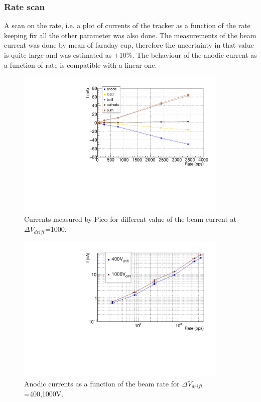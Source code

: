 \documentclass[a4paper, 11 pt]{report}
\newcommand{\Vdrift}{$ \Delta V_{drift}$}
\begin{document}
  \subsubsection{Rate scan}

  A scan on the rate, i.e. a plot of currents of the tracker as a function of the 
  rate keeping fix all the other parameter was also done.
  The measurements of the beam current was done by mean of faraday cup, therefore
  the uncertainty in that value is quite large and was estimated as $\pm$10\%.
  The behaviour of the anodic current as a function of rate is compatible with
  a linear one.
  \begin{figure}[htbp]
	\centering
	\includegraphics[width=0.90\textwidth]{Immagini/Rate_FULL_1000V.pdf}
	\caption{Currents measured by Pico for different value of the beam current at
	\Vdrift=1000.}
	\label{fig:Rate_allcurrents_FULL}
  \end{figure}

  \begin{figure}[htbp]
	\centering
	\includegraphics[width=0.90\textwidth]{Immagini/RateScan_FULL.pdf}
	\caption{Anodic currents as a function of the beam rate for \Vdrift=400,1000V.}
	\label{fig:Rate_anodic_cuurent_FULL}
  \end{figure}
\end{document}
